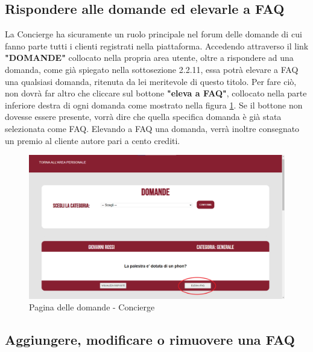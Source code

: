 \documentclass [a4paper, 12pt]{book}
\begin{document}
\subsection{Rispondere alle domande ed elevarle a FAQ}
La Concierge ha sicuramente un ruolo principale nel forum delle domande di cui fanno parte tutti i clienti registrati nella piattaforma. Accedendo attraverso il link \textbf{"DOMANDE"} collocato nella propria area utente, oltre a rispondere ad una domanda, come già spiegato nella sottosezione 2.2.11, essa potrà elevare a FAQ una qualsiasi domanda, ritenuta da lei meritevole di questo titolo. Per fare ciò, non dovrà far altro che cliccare sul bottone \textbf{"eleva a FAQ"}, collocato nella parte inferiore destra di ogni domanda come mostrato nella figura \ref{DomandeStaff}. Se il bottone non dovesse essere presente, vorrà dire che quella specifica domanda è già stata selezionata come FAQ. Elevando a FAQ una domanda, verrà inoltre consegnato un premio al cliente autore pari a cento crediti.  

\begin{figure}[h]
\centering
\includegraphics[scale=0.3]{DomandeStaff.png}
\caption{Pagina delle domande - Concierge}
\label{DomandeStaff}
\end{figure}

\subsection{Aggiungere, modificare o rimuovere una FAQ}
\end{document}
